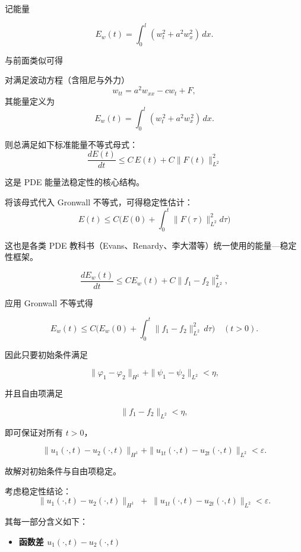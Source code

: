 \begin{solution}
\begin{itemize}
记能量

\[
E_w(t)=\int_0^l (w_t^2 + a^2 w_x^2)\, dx.
\]

与前面类似可得
\begin{dxtips}
   \begin{note}[能量不等式的标准模板]

对满足波动方程（含阻尼与外力）
\[
w_{tt}=a^{2}w_{xx}-c w_t + F,
\]
其能量定义为
\[
E_w(t)=\int_{0}^{l}\left(w_t^{\,2}+a^{2}w_x^{\,2}\right)\,dx.
\]

则总满足如下标准能量不等式母式：
\[
\boxed{
\frac{dE(t)}{dt} \le C\,E(t) + C\|F(t)\|_{L^2}^2
}
\]

这是 PDE 能量法稳定性的核心结构。

\medskip

将该母式代入 Gronwall 不等式，可得稳定性估计：
\[
\boxed{
E(t) \le C\Big(E(0) + \int_{0}^{t}\|F(\tau)\|_{L^2}^2 d\tau\Big)
}
\]

这也是各类 PDE 教科书（Evans、Renardy、李大潜等）统一使用的能量—稳定性框架。

\end{note}
\end{dxtips}
\[
\frac{dE_w(t)}{dt}
\le C E_w(t) + C\|f_1-f_2\|_{L^2}^2,
\]

应用 Gronwall 不等式得

\[
E_w(t)
\le C\Big(E_w(0)+\int_0^t \|f_1-f_2\|_{L^2}^2\, d\tau\Big)
\quad (t>0).
\]

因此只要初始条件满足

\[
\|\varphi_1-\varphi_2\|_{H^1} + \|\psi_1-\psi_2\|_{L^2} < \eta,
\]

并且自由项满足

\[
\|f_1-f_2\|_{L^2}<\eta,
\]

即可保证对所有 $t>0$，

\[
\|u_1(\cdot,t)-u_2(\cdot,t)\|_{H^1}
+\|u_{1t}(\cdot,t)-u_{2t}(\cdot,t)\|_{L^2}
<\varepsilon .
\]

故解对初始条件与自由项稳定。

\end{itemize}
\begin{note}[波动方程稳定性不等式的含义]

考虑稳定性结论：
\[
\|u_1(\cdot,t)-u_2(\cdot,t)\|_{H^1}
\;+\;
\|u_{1t}(\cdot,t)-u_{2t}(\cdot,t)\|_{L^2}
<\varepsilon .
\]

其每一部分含义如下：

\begin{itemize}

  \item \textbf{函数差 $u_1(\cdot,t)-u_2(\cdot,t)$}


\end{itemize}
\end{note}
\end{solution}
